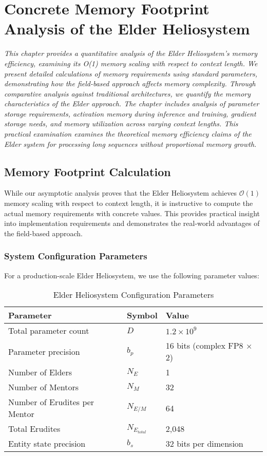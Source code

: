 \chapter{Concrete Memory Footprint Analysis of the Elder Heliosystem}

\textit{This chapter provides a quantitative analysis of the Elder Heliosystem's memory efficiency, examining its O(1) memory scaling with respect to context length. We present detailed calculations of memory requirements using standard parameters, demonstrating how the field-based approach affects memory complexity. Through comparative analysis against traditional architectures, we quantify the memory characteristics of the Elder approach. The chapter includes analysis of parameter storage requirements, activation memory during inference and training, gradient storage needs, and memory utilization across varying context lengths. This practical examination examines the theoretical memory efficiency claims of the Elder system for processing long sequences without proportional memory growth.}

\section{Memory Footprint Calculation}

While our asymptotic analysis proves that the Elder Heliosystem achieves $\mathcal{O}(1)$ memory scaling with respect to context length, it is instructive to compute the actual memory requirements with concrete values. This provides practical insight into implementation requirements and demonstrates the real-world advantages of the field-based approach.

\subsection{System Configuration Parameters}

For a production-scale Elder Heliosystem, we use the following parameter values:

\begin{table}[h]
\centering
\begin{tabular}{|l|l|l|}
\hline
\textbf{Parameter} & \textbf{Symbol} & \textbf{Value} \\
\hline
Total parameter count & $D$ & $1.2 \times 10^9$ \\
Parameter precision & $b_p$ & 16 bits (complex FP8 × 2) \\
Number of Elders & $N_E$ & 1 \\
Number of Mentors & $N_M$ & 32 \\
Number of Erudites per Mentor & $N_{E/M}$ & 64 \\
Total Erudites & $N_{E_{total}}$ & 2,048 \\
Entity state precision & $b_s$ & 32 bits per dimension \\
\hline
\end{tabular}
\caption{Elder Heliosystem Configuration Parameters}
\end{table}

